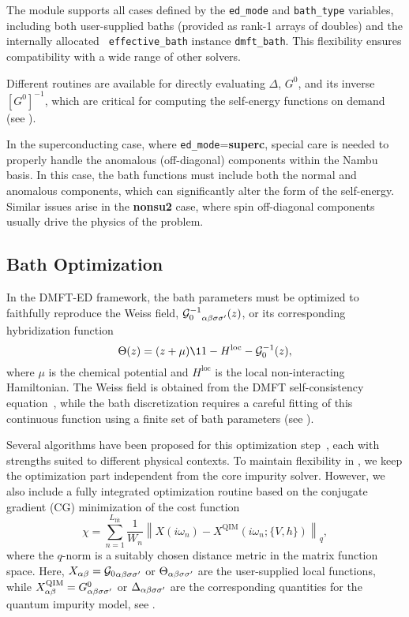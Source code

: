 \documentclass[edipack_sp.tex]{subfiles}
\begin{document}
The module supports all cases defined by the {\tt ed\_mode} and 
{\tt bath\_type} variables, including both user-supplied baths (provided 
as rank-1 arrays of doubles) and the internally allocated {\tt 
effective\_bath} instance {\tt dmft\_bath}. This flexibility ensures 
compatibility with a wide range of other solvers.

Different routines are available for directly evaluating $\Delta$, 
$G^0$, and its inverse $[G^0]^{-1}$, which are critical for computing 
the self-energy functions on demand (see ). 

In the superconducting case, where {\tt ed\_mode}={\bf superc}, 
special care is needed to properly handle the anomalous (off-diagonal) 
components within the Nambu basis. In this case, the bath functions 
must include both the normal and anomalous components, 
which can significantly alter the form of the self-energy. Similar issues arise in the {\bf nonsu2} case, where spin off-diagonal components usually drive the physics of the problem.




\subsection{Bath Optimization}\label{sSecFit}
In the DMFT-ED framework, the bath parameters must be optimized to 
faithfully reproduce the Weiss field, 
${{\cal G}^{-1}_{0}}_{\alpha\beta\sigma\sigma'}(z)$, or its corresponding hybridization 
function 
\begin{equation}
\Theta(z) = (z + \mu)\11 - H^\mathrm{loc} - \GG_0^{-1}(z),
\end{equation}
where $\mu$ is the chemical potential and $H^\mathrm{loc}$ is the 
local non-interacting Hamiltonian. The Weiss field is obtained from the DMFT 
self-consistency equation~\cite{Georges1996RMP}, while the bath 
discretization requires a careful fitting of this continuous function 
using a finite set of bath parameters (see ).

Several algorithms have been proposed for this optimization 
step~\cite{Garcia2004PRL,Taranto2012PRB,Mejuto_Bath_ASCI-DMFT}, each with strengths suited 
to different physical contexts. To maintain flexibility in \NAME, 
we keep the optimization part independent 
from the core impurity solver. However, we also include a fully 
integrated optimization routine based on the conjugate gradient (CG) 
minimization of the cost function
\begin{equation}
\chi = \sum_{n=1}^{L_\mathrm{fit}} 
\frac{1}{W_n} \left\|X(i\omega_n) - 
X^\mathrm{QIM}(i\omega_n; \{V, h\}) \right\|_q,
\label{eq:chiq}
\end{equation}
where the $q$-norm is a suitably chosen distance metric in the 
matrix function space. Here, $X_{\alpha\beta} = {{\cal G}_{0}}_{\alpha\beta\sigma\sigma'}$ or 
$\Theta_{\alpha\beta\sigma\sigma'}$ are the user-supplied local functions, while 
$X_{\alpha\beta}^\mathrm{QIM} = G^0_{\alpha\beta\sigma\sigma'}$ or 
$\Delta_{\alpha\beta\sigma\sigma'}$ are the corresponding quantities for the quantum 
impurity model, see .
\end{document}
